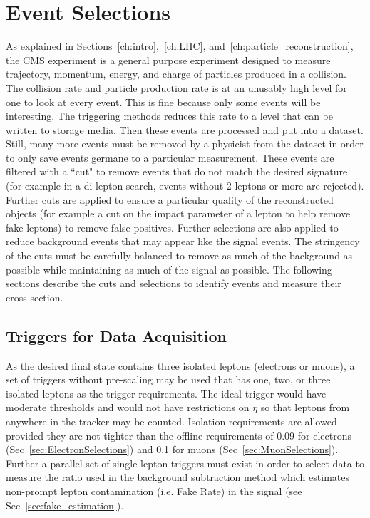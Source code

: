 \chapter{Event Selections}
\label{ch:EventSelections}
As explained in Sections~\ref{ch:intro},~\ref{ch:LHC}, and~\ref{ch:particle_reconstruction}, the CMS experiment is a general purpose experiment designed to measure trajectory, momentum, energy, and charge of particles produced in a collision. The collision rate and particle production rate is at an unusably high level for one to look at every event. This is fine because only some events will be interesting. The triggering methods reduces this rate to a level that can be written to storage media. Then these events are processed and put into a dataset. Still, many more events must be removed by a physicist from the dataset in order to only save events germane to a particular measurement. These events are filtered with a ``cut" to remove events that do not match the desired signature (for example in a di-lepton search, events without 2 leptons or more are rejected). Further cuts are applied to ensure a particular quality of the reconstructed objects (for example a cut on the impact parameter of a lepton to help remove fake leptons) to remove false positives. Further selections are also applied to reduce background events that may appear like the signal events. The stringency of the cuts must be carefully balanced to remove as much of the background as possible while maintaining as much of the signal as possible. The following sections describe the cuts and selections to identify \ttZ events and measure their cross section.\\

\section{Triggers for Data Acquisition}
\label{sec:Triggers}
As the desired final state contains three isolated leptons (electrons or muons), a set of triggers without pre-scaling may be used that has one, two, or three isolated leptons as the trigger requirements. The ideal trigger would have moderate \pt thresholds and would not have restrictions on $\eta$ so that leptons from anywhere in the tracker may be counted. Isolation requirements are allowed provided they are not tighter than the offline requirements of 0.09 for electrons (Sec~\ref{sec:ElectronSelections}) and 0.1 for muons (Sec~\ref{sec:MuonSelections}). Further a parallel set of single lepton triggers must exist in order to select data to measure the ratio used in the background subtraction method which estimates non-prompt lepton contamination (i.e. Fake Rate) in the signal (see Sec~\ref{sec:fake_estimation}). \\


